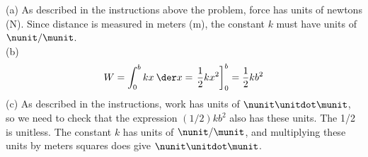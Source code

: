 (a) As described in the instructions above the problem,
force has units of newtons (N). Since distance is measured in meters (m),
the constant $k$ must have units of $\nunit/\munit$.\\
(b)
\begin{equation*}
  W = \int_0^b kx\:\der x = \left.\frac{1}{2}kx^2\right]_0^b = \frac{1}{2}kb^2
\end{equation*}
(c) As described in the instructions, work has units of $\nunit\unitdot\munit$,
so we need to check that the expression $(1/2)kb^2$ also has these units.
The 1/2 is unitless. The constant $k$ has units of $\nunit/\munit$, and multiplying
these units by meters squares does give $\nunit\unitdot\munit$.
